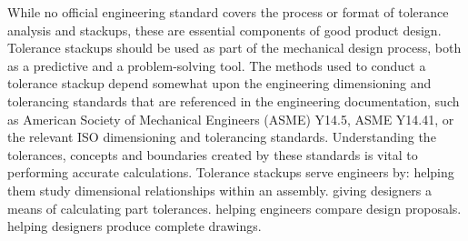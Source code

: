 While no official engineering standard covers the process or format of tolerance analysis and stackups, these are essential components of good product design. Tolerance stackups should be used as part of the mechanical design process, both as a predictive and a problem-solving tool. The methods used to conduct a tolerance stackup depend somewhat upon the engineering dimensioning and tolerancing standards that are referenced in the engineering documentation, such as American Society of Mechanical Engineers (ASME) Y14.5, ASME Y14.41, or the relevant ISO dimensioning and tolerancing standards. Understanding the tolerances, concepts and boundaries created by these standards is vital to performing accurate calculations.
Tolerance stackups serve engineers by:
 helping them study dimensional relationships within an assembly.
 giving designers a means of calculating part tolerances.
 helping engineers compare design proposals.
 helping designers produce complete drawings.
